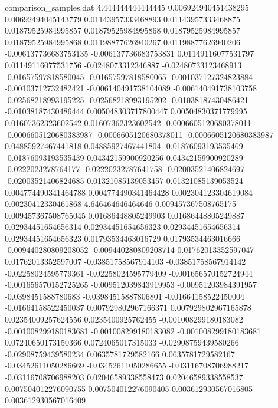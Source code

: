 \begin{filecontents}{comparison_samples.dat}
4.444444444444445   0.006924940451438295    0.00692494045143779     0.01143957333468893    0.01143957333468875    0.01879525984995857    0.01879525984995868    0.01879525984995857    0.01879525984995868    0.01198877626940267    0.01198877626940206    -0.006137736683753135   -0.006137736683753831   0.01149116077531797    0.01149116077531756    -0.0248073312346887     -0.02480733123468913    -0.01657597818580045    -0.01657597818580065    -0.001037127324823884   -0.00103712732482421    -0.006140491738104089   -0.006140491738103758   -0.02568218993195225    -0.02568218993195202    -0.01038187430486421    -0.01038187430486444    0.005048303717800447   0.00504830371779995    0.01607362323602542    0.01607362323602542    -0.0006605120680378011  -0.0006605120680383987  -0.0006605120680378011  -0.0006605120680383987  0.04885927467441818    0.04885927467441804    -0.01876093193535469    -0.01876093193535439    0.04342159900920256    0.04342159900920289    -0.0222023278764177     -0.02220232787641758    -0.02003521406824697    -0.02003521406824685    0.01321085139053457    0.01321085139053524    0.004774490341464788   0.004774490341464428   0.002304123304619084    0.00230412330461868   
4.646464646464646   0.009457367508765175    0.009457367508765045    0.01686448805249903    0.01686448805249887    0.02934451654656314    0.02934451654656323    0.02934451654656314    0.02934451654656323    0.01793534463016729    0.01793534463016666    -0.009440280809208052   -0.009440280809208714   0.01762013352597047    0.01762013352597007    -0.03851758567914103    -0.03851758567914142    -0.02258024595779361    -0.02258024595779409    -0.001656570152724944   -0.001656570152725265   -0.009512039843919953   -0.00951203984391957    -0.0398451588780683     -0.03984515887806801    -0.01664158522450004    -0.01664158522450037    0.007929802967166371   0.007929802967165878   0.02354009257624556    0.0235400925762455     -0.001008299180183082   -0.001008299180183681   -0.001008299180183082   -0.001008299180183681   0.07240650173150366    0.0724065017315033     -0.02908759439580266    -0.02908759439580234    0.0635781729582166     0.0635781729582167     -0.03452611050286669    -0.03452611050286655    -0.03116708706988217    -0.03116708706988203    0.02046589338558473    0.02046589338558537    0.007504012276090755   0.007504012276090405   0.003612930567016805    0.003612930567016409  

\end{filecontents}
